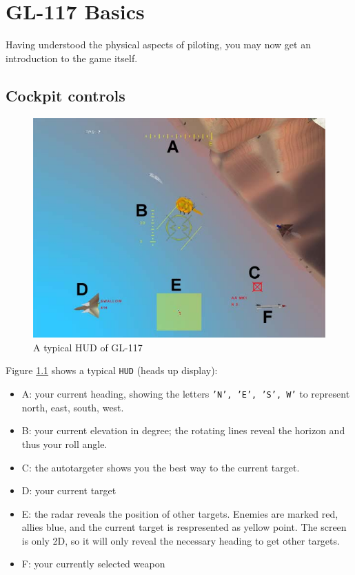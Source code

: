 \chapter{GL-117 Basics}
\label{chap:basics}

Having understood the physical aspects of piloting,
you may now get an introduction to the game itself.

\section{Cockpit controls}
\label{sec:cockpit}

\begin{figure}
\begin{center}
\includegraphics[width=12cm]{hud.jpg}
\caption{A typical HUD of GL-117}
\label{fig:hud}
\end{center}
\end{figure}

Figure \ref{fig:hud} shows a typical \texttt{HUD} (heads up display):
\begin{itemize}
\item{A: your current heading, showing the letters \texttt{'N', 'E', 'S', W'}
to represent north, east, south, west.}
\item{B: your current elevation in degree; the rotating lines reveal the
horizon and thus your roll angle.}
\item{C: the autotargeter shows you the best way to the current target.}
\item{D: your current target}
\item{E: the radar reveals the position of other targets. Enemies are marked red,
allies blue, and the current target is respresented as yellow point.
The screen is only 2D, so it will only reveal the necessary heading to get
other targets.}
\item{F: your currently selected weapon}
\end{itemize}



